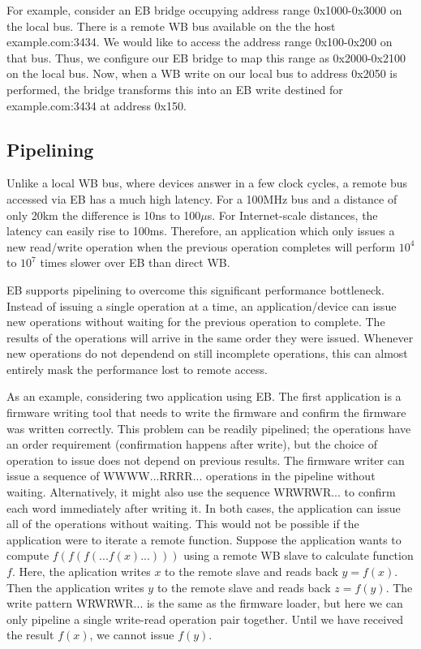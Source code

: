 \documentclass{article}
\begin{document}
For example, 
consider an EB bridge occupying address range 0x1000-0x3000 on the local bus.
There is a remote WB bus available on the the host example.com:3434.
We would like to access the address range 0x100-0x200 on that bus.
Thus, we configure our EB bridge to map this range as 0x2000-0x2100 on the
local bus.
Now, when a WB write on our local bus to address 0x2050 is performed,
the bridge transforms this into an EB write destined for example.com:3434 
at address 0x150.

\subsection{Pipelining}
\label{sec:pipeline}

Unlike a local WB bus, where devices answer in a few clock cycles,
a remote bus accessed via EB has a much high latency.
For a 100MHz bus and a distance of only 20km the difference is
10ns to 100$\mu$s. 
For Internet-scale distances, the latency can easily rise to 100ms.
Therefore, 
an application which only issues a new read/write operation when the previous
operation completes will perform $10^4$ to $10^7$ times slower over EB than direct WB.

EB supports pipelining to overcome this significant performance bottleneck.
Instead of issuing a single operation at a time,
an application/device can issue new operations without waiting
for the previous operation to complete.
The results of the operations will arrive in the same order they were issued.
Whenever new operations do not dependend on still incomplete operations,
this can almost entirely mask the performance lost to remote access.

As an example, considering two application using EB.
The first application is a firmware writing tool that needs to write the
firmware and confirm the firmware was written correctly.
This problem can be readily pipelined; 
the operations have an order requirement (confirmation happens after write),
but the choice of operation to issue does not depend on previous results.
The firmware writer can issue a sequence of WWWW...RRRR... operations
in the pipeline without waiting.
Alternatively, it might also use the sequence WRWRWR... to confirm each word
immediately after writing it.
In both cases, the application can issue all of the operations without waiting.
This would not be possible if the application were to iterate a remote function.
Suppose the application wants to compute $f(f(f(...f(x)...)))$ 
using a remote WB slave to calculate function $f$.
Here, the aplication writes $x$ to the remote slave and reads back
$y = f(x)$.
Then the application writes $y$ to the remote slave and reads back
$z = f(y)$.
The write pattern WRWRWR... is the same as the firmware loader,
but here we can only pipeline a single write-read operation pair together.
Until we have received the result $f(x)$, we cannot issue $f(y)$.
\end{document}
